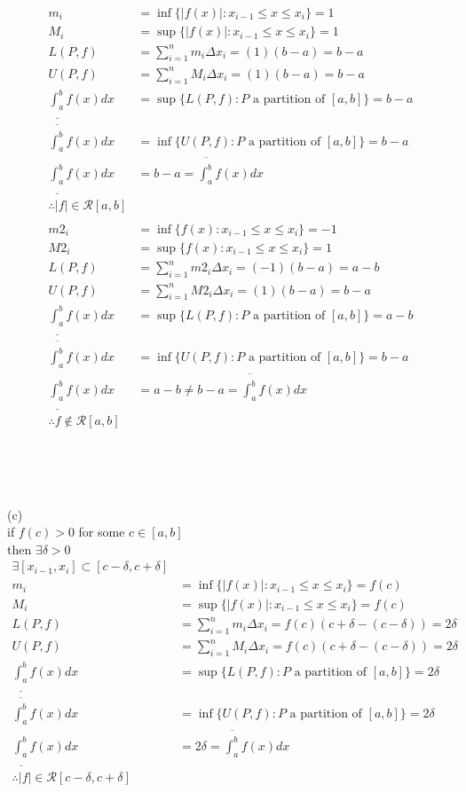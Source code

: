 \documentclass[12pt, border = 4pt, multi]{article} %
\begin{document}
\begin{align*}
m_i &= \inf\{|f(x)|: x_{i - 1} \leq x \leq x_i\} = 1\\
M_i &= \sup\{|f(x)|: x_{i - 1} \leq x \leq x_i\} = 1\\
L(P, f) &= \sum_{i = 1} ^ n m_i \Delta x_i = (1)(b - a) = b - a\\
U(P, f) &= \sum_{i = 1} ^ n M_i \Delta x_i = (1)(b - a) = b - a\\
\underline{\int_a ^ b}f(x)dx &= \sup\{L(P, f): P \text{ a partition of }[a, b]\} = b - a\\
\overline{\int_a ^ b}f(x)dx &= \inf\{U(P, f): P \text{ a partition of }[a, b]\} = b - a\\
\underline{\int_a ^ b}f(x)dx &= b - a = \overline{\int_a ^ b}f(x)dx\\
\therefore |f| \in \mathscr{R}[a, b]\\
\\
m2_i &= \inf\{f(x): x_{i - 1} \leq x \leq x_i\} = -1\\
M2_i &= \sup\{f(x): x_{i - 1} \leq x \leq x_i\} = 1\\
L(P, f) &= \sum_{i = 1} ^ n m2_i \Delta x_i = (-1)(b - a) = a - b\\
U(P, f) &= \sum_{i = 1} ^ n M2_i \Delta x_i = (1)(b - a) = b - a\\
\underline{\int_a ^ b}f(x)dx &= \sup\{L(P, f): P \text{ a partition of }[a, b]\} = a - b\\
\overline{\int_a ^ b}f(x)dx &= \inf\{U(P, f): P \text{ a partition of }[a, b]\} = b - a\\
\underline{\int_a ^ b}f(x)dx &= a - b \not= b - a = \overline{\int_a ^ b}f(x)dx\\
\therefore f \not\in \mathscr{R}[a, b]\\
\end{align*}
\\
\\
\\
\\
(c)\\
if $f(c) > 0$ for some $c \in [a, b]$\\
then $\exists \delta > 0$
\begin{align*}
\exists [x_{i - 1}, x_i] \subset [c - \delta, c + \delta]\\
m_i &= \inf\{|f(x)|: x_{i - 1} \leq x \leq x_i\} = f(c)\\
M_i &= \sup\{|f(x)|: x_{i - 1} \leq x \leq x_i\} = f(c)\\
L(P, f) &= \sum_{i = 1} ^ n m_i \Delta x_i = f(c)(c + \delta - (c - \delta)) = 2\delta\\
U(P, f) &= \sum_{i = 1} ^ n M_i \Delta x_i = f(c)(c + \delta - (c - \delta)) = 2\delta\\
\underline{\int_a ^ b}f(x)dx &= \sup\{L(P, f): P \text{ a partition of }[a, b]\} = 2\delta\\
\overline{\int_a ^ b}f(x)dx &= \inf\{U(P, f): P \text{ a partition of }[a, b]\} = 2\delta\\
\underline{\int_a ^ b}f(x)dx &= 2\delta = \overline{\int_a ^ b}f(x)dx\\
\therefore |f| \in \mathscr{R}[c - \delta, c + \delta]\\
\end{align*}
\end{document}

